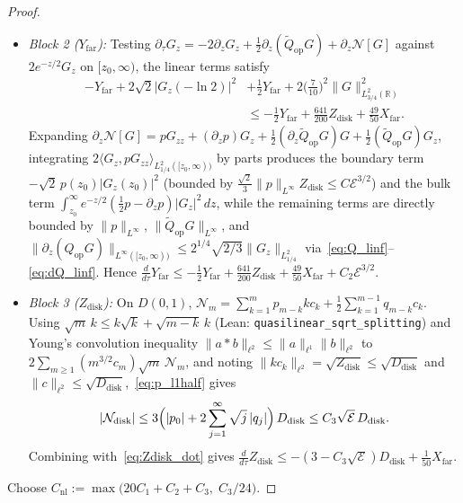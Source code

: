 \documentclass[11pt,a4paper]{article}
\begin{document}
\begin{proof}
\begin{itemize}
\item \emph{Block 2 ($Y_{\mathrm{far}}$):}
  Testing $\partial_\tau G_z = -2\partial_z G_z + \tfrac12\partial_z(\widetilde{Q}_{\mathrm{op}}G) + \partial_z\mathcal{N}[G]$
  against $2e^{-z/2}G_z$ on $[z_0,\infty)$, the linear terms satisfy
  \begin{align*}
  -Y_{\mathrm{far}} + 2\sqrt{2}|G_z(-\ln 2)|^2 &+ \tfrac12 Y_{\mathrm{far}} + 2\bigl(\tfrac{7}{10}\bigr)^2\|G\|_{L^2_{3/4}(\mathbb{R})}^2 \\
  &\le -\tfrac12 Y_{\mathrm{far}} + \frac{641}{200}Z_{\mathrm{disk}} + \frac{49}{50}X_{\mathrm{far}}.
  \end{align*}
  Expanding $\partial_z\mathcal{N}[G]=p G_{zz}+(\partial_z p)G_z+\tfrac12(\partial_z\widetilde{Q}_{\mathrm{op}}G)G+\tfrac12(\widetilde{Q}_{\mathrm{op}}G)G_z$,
  integrating $2\langle G_z, p G_{zz}\rangle_{L^2_{1/4}([z_0,\infty))}$ by parts produces the boundary term
  $-\sqrt{2}\,p(z_0)|G_z(z_0)|^2$ (bounded by $\frac{\sqrt{2}}{3}\|p\|_{L^\infty}Z_{\mathrm{disk}}\le C\mathcal{E}^{3/2}$)
  and the bulk term $\int_{z_0}^\infty e^{-z/2}(\tfrac12 p - \partial_z p)|G_z|^2\,dz$, while the remaining terms
  are directly bounded by $\|p\|_{L^\infty}$, $\|\widetilde{Q}_{\mathrm{op}}G\|_{L^\infty}$, and
  $\|\partial_z(Q_{\mathrm{op}}G)\|_{L^\infty([z_0,\infty))}\le 2^{1/4}\sqrt{2/3}\|G_z\|_{L^2_{1/4}}$ via~\eqref{eq:Q_linf}--\eqref{eq:dQ_linf}.
  Hence $\frac{d}{d\tau}Y_{\mathrm{far}}\le -\frac{1}{2}Y_{\mathrm{far}} + \frac{641}{200}Z_{\mathrm{disk}} + \frac{49}{50}X_{\mathrm{far}} + C_2\mathcal{E}^{3/2}$.
\item \emph{Block 3 ($Z_{\mathrm{disk}}$):}
  On $D(0,1)$, $\mathcal{N}_m = \sum_{k=1}^m p_{m-k} k c_k + \frac{1}{2}\sum_{k=1}^{m-1} q_{m-k} c_k$.
  Using $\sqrt{m}\,k \le k\sqrt{k} + \sqrt{m-k}\,k$ (Lean: \texttt{quasilinear\_\allowbreak sqrt\_splitting}) and Young's
  convolution inequality $\|a*b\|_{\ell^2}\le\|a\|_{\ell^1}\|b\|_{\ell^2}$ to
  $2\sum_{m\ge 1}(m^{3/2}c_m)\sqrt{m}\,\mathcal{N}_m$, and noting $\|k c_k\|_{\ell^2}=\sqrt{Z_{\mathrm{disk}}}\le\sqrt{D_{\mathrm{disk}}}$
  and $\|c\|_{\ell^2}\le\sqrt{D_{\mathrm{disk}}}$,~\eqref{eq:p_l1half} gives
  \[
  |\mathcal{N}_{\mathrm{disk}}| \le 3\Bigl(|p_0| + 2\sum_{j=1}^\infty\sqrt{j}\,|q_j|\Bigr)\,D_{\mathrm{disk}} \le C_3\sqrt{\mathcal{E}}\,D_{\mathrm{disk}}.
  \]
  Combining with~\eqref{eq:Zdisk_dot} gives $\frac{d}{d\tau}Z_{\mathrm{disk}} \le -(3 - C_3\sqrt{\mathcal{E}})D_{\mathrm{disk}} + \frac{1}{50}X_{\mathrm{far}}$.
\end{itemize}
Choose $C_{\mathrm{nl}} := \max\bigl(20 C_1 + C_2 + C_3,\; C_3/24\bigr)$.

\end{proof}
\end{document}
